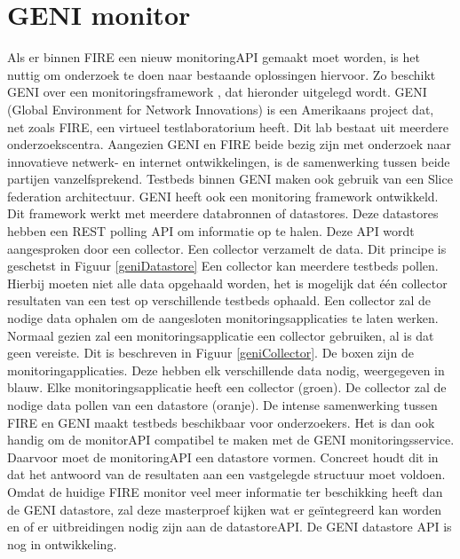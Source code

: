 \section{GENI monitor}
\npar
Als er binnen FIRE een nieuw monitoringAPI gemaakt moet worden, is het nuttig om onderzoek te doen naar bestaande oplossingen hiervoor. Zo beschikt GENI over een monitoringsframework \citep{geni-monitor}, dat hieronder uitgelegd wordt.
\npar
GENI (Global Environment for Network Innovations) is een Amerikaans project dat, net zoals FIRE, een virtueel testlaboratorium heeft. Dit lab bestaat uit meerdere onderzoekscentra. Aangezien GENI en FIRE beide bezig zijn met onderzoek naar innovatieve netwerk- en internet ontwikkelingen, is de samenwerking tussen beide partijen vanzelfsprekend.
\clearpage
\npar
Testbeds binnen GENI maken ook gebruik van een Slice federation architectuur. GENI heeft ook een monitoring framework ontwikkeld. Dit framework werkt met meerdere databronnen of datastores. Deze datastores hebben een REST polling API om informatie op te halen. Deze API wordt aangesproken door een collector. Een collector verzamelt de data. Dit principe is geschetst in Figuur \ref{geniDatastore}
\npar
Een collector kan meerdere testbeds pollen. Hierbij moeten niet alle data opgehaald worden, het is mogelijk dat \'e\'en collector resultaten van een test op verschillende testbeds ophaald. Een collector zal de nodige data ophalen om de aangesloten monitoringsapplicaties te laten werken. Normaal gezien zal een monitoringsapplicatie een collector gebruiken, al is dat geen vereiste. Dit is beschreven in Figuur \ref{geniCollector}. De boxen zijn de monitoringapplicaties. Deze hebben elk verschillende data nodig, weergegeven in blauw. Elke monitoringsapplicatie heeft een collector (groen). De collector zal de nodige data pollen van een datastore (oranje).
\npar
De intense samenwerking tussen FIRE en GENI maakt testbeds beschikbaar voor onderzoekers. Het is dan ook handig om de monitorAPI compatibel te maken met de GENI monitoringsservice. Daarvoor moet de monitoringAPI een datastore vormen. Concreet houdt dit in dat het antwoord van de resultaten aan een vastgelegde structuur moet voldoen. Omdat de huidige FIRE monitor veel meer informatie ter beschikking heeft dan de GENI datastore, zal deze masterproef kijken wat er ge\"integreerd kan worden en of er uitbreidingen nodig zijn aan de datastoreAPI. De GENI datastore API is nog in ontwikkeling.
